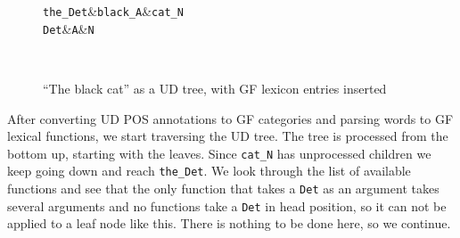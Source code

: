 \begin{figure}[H]
    \centering
    \begin{dependency}
        \begin{deptext}[column sep=0.4cm]
              {\tt the\_Det}\&{\tt black\_A}\&{\tt cat\_N}\\
            {\tt Det}\&{\tt A}\&{\tt N}\\
        \end{deptext}
    \end{dependency} \\
    \caption{``The black cat'' as a UD tree, with GF lexicon entries inserted}
    \label{fig:the_black_cat_ud_gf}
\end{figure}



After converting \ac{UD} \ac{POS} annotations to \ac{GF} categories and parsing words to \ac{GF} lexical functions, we start traversing the \ac{UD} tree. The tree is processed from the bottom up, starting with the leaves. Since \lstinline{cat_N} has unprocessed children we keep going down and reach \lstinline{the_Det}. We look through the list of available functions and see that the only function that takes a \lstinline{Det} as an argument takes several arguments and no functions take a \texttt{Det} in head position, so it can not be applied to a leaf node like this. There is nothing to be done here, so we continue.

